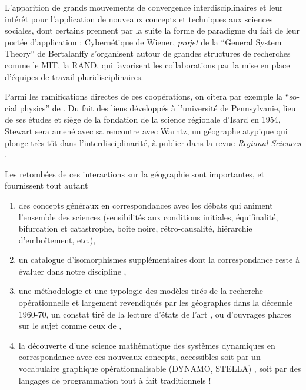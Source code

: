 L'apparition de grands mouvements de convergence interdisciplinaires et leur intérêt pour l'application de nouveaux concepts et techniques aux sciences sociales, dont certains prennent par la suite la forme de paradigme du fait de leur portée d'application : Cybernétique de Wiener, \textit{projet} de la \foreignquote{english}{General System Theory} de Bertalanffy \autocite[9]{Pouvreau2013} s'organisent autour de grandes structures de recherches comme le MIT, la RAND, qui favorisent les collaborations par la mise en place d'équipes de travail pluridisciplinaires.

Parmi les ramifications directes de ces coopérations, on citera par exemple la \foreignquote{english}{social physics} de \textcite{Stewart1947}. Du fait des liens développés à l'université de Pennsylvanie, lieu de ses études et siège de la fondation de la science régionale d'Isard en 1954, Stewart sera amené avec sa rencontre avec Warntz, un géographe atypique qui plonge très tôt dans l'interdisciplinarité, à publier dans la revue \textit{Regional Sciences} \autocite{Stewart1958}.

Les retombées de ces interactions sur la géographie sont importantes, et fournissent tout autant 
\begin{enumerate}[label=(\alph*)] \item des concepts généraux en correspondances avec les débats qui animent l'ensemble des sciences (sensibilités aux conditions initiales, équifinalité, bifurcation et catastrophe, boîte noire, rétro-causalité, hiérarchie d'emboîtement, etc.), \item un catalogue d'isomorphismes supplémentaires dont la correspondance reste à évaluer dans notre discipline \autocite{Wilson1969}, \item  une méthodologie et une typologie des modèles tirés de la recherche opérationnelle \autocite{Ackoff1962} et largement revendiqués par les géographes dans la décennie 1960-70, un constat tiré de la lecture d'états de l'art \autocite{Kohn1970}, ou d'ouvrages phares sur le sujet comme ceux de \textcites{Berry1964a, Haggett1965}, \item la découverte d'une science mathématique des systèmes dynamiques en correspondance avec ces nouveaux concepts, accessibles soit par un vocabulaire graphique opérationnalisable (DYNAMO, STELLA) \autocite{Forrester1961}, soit par des langages de programmation tout à fait traditionnels \autocite[304-305]{Batty1976} ! \end{enumerate}

